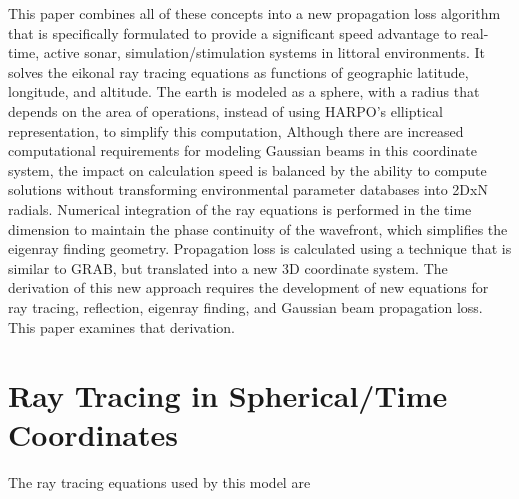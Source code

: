 \documentclass{ws-jca}
\newcommand{\threeD}{3\nobreakdash\textendash D }	%
\newcommand{\twoDxN}{2\nobreakdash\textendash DxN }
\begin{document}
This paper combines all of these concepts into a new propagation loss algorithm that is
specifically formulated to provide a significant speed advantage to real-time, active sonar, simulation/stimulation systems in littoral environments.  It solves
the eikonal ray tracing equations as functions of geographic latitude,
longitude, and altitude. The earth is modeled
as a sphere, with a radius that depends on the area of operations, instead
of using HARPO's elliptical representation, to simplify this computation,  
Although there are increased
computational requirements for modeling Gaussian beams in this
coordinate system, the impact on calculation speed is 
balanced by the ability to compute solutions
without transforming environmental parameter databases into \twoDxN radials.
Numerical integration of the ray equations is performed in the time
dimension to maintain the phase continuity of the wavefront, which
simplifies the eigenray finding geometry. Propagation loss is calculated
using a technique that is similar to GRAB, but translated into a new \threeD coordinate system. The derivation of this new approach requires
the development of new equations for ray tracing, reflection, eigenray
finding, and Gaussian beam propagation loss. This paper examines
that derivation.

\section{Ray Tracing in Spherical/Time Coordinates}

The ray tracing equations used by this model are
\end{document}
